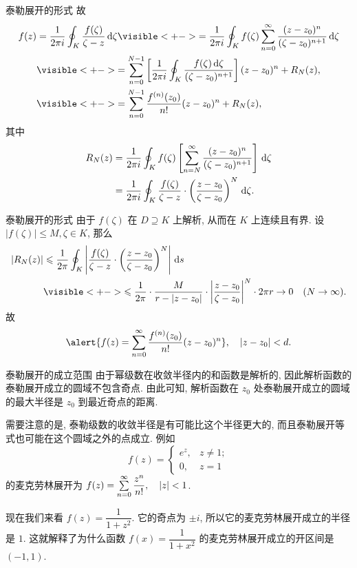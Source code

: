 \begin{frame}{泰勒展开的形式}
	\onslide<+->
	故
	\begin{align*}
		f(z)&=\frac1{2\pi i}\oint_K \frac{f(\zeta)}{\zeta-z}\diff\zeta
		\visible<+->{=\frac1{2\pi i}\oint_K f(\zeta)\sum_{n=0}^\infty\frac{(z-z_0)^n}{(\zeta-z_0)^{n+1}}\diff\zeta}\\
		&\visible<+->{=
		\sum_{n=0}^{N-1}\left[\frac1{2\pi i}\oint_K\frac{f(\zeta)\diff\zeta}{(\zeta-z_0)^{n+1}}\right](z-z_0)^n+R_N(z),}\\
		&\visible<+->{=
		\sum_{n=0}^{N-1}\frac{f^{(n)}(z_0)}{n!}(z-z_0)^n+R_N(z),}
	\end{align*}
	\onslide<+->
	其中
	\begin{align*}
		R_N(z)&=\frac1{2\pi i}\oint_Kf(\zeta)\left[\sum_{n=N}^\infty\frac{(z-z_0)^n}{(\zeta-z_0)^{n+1}}\right]\,\mathrm{d}\zeta\\
		&=\frac1{2\pi i}\oint_K\frac{f(\zeta)}{\zeta-z}\cdot\left(\frac{z-z_0}{\zeta-z_0}\right)^N\,\mathrm{d}\zeta.
	\end{align*}
\end{frame}


\begin{frame}{泰勒展开的形式}
	\onslide<+->
	由于 $f(\zeta)$ 在 $D\supseteq K$ 上解析, 从而在 $K$ 上连续且有界.
	\onslide<+->
	设 $|f(\zeta)|\le M,\zeta\in K$,
	\onslide<+->
	那么
	\begin{align*}
		|R_N(z)|&\le\frac 1{2\pi}\oint_K\abs{\frac{f(\zeta)}{\zeta-z}\cdot\left(\frac{z-z_0}{\zeta-z_0}\right)^N}\diff s\\
		&\visible<+->{\le\frac 1{2\pi}\cdot \frac M{r-|z-z_0|}\cdot\abs{\frac{z-z_0}{\zeta-z_0}}^N\cdot 2\pi r\to 0\quad (N\to\infty).}
	\end{align*}
	\onslide<+->
	故
	\[\alert{f(z)=\sum_{n=0}^\infty\frac{f^{(n)}(z_0)}{n!}(z-z_0)^n},\quad |z-z_0|<d.\]
\end{frame}


\begin{frame}{泰勒展开的成立范围}
	\onslide<+->
	由于幂级数在收敛半径内的和函数是解析的, 因此解析函数的泰勒展开成立的圆域不包含奇点.
	\onslide<+->
	由此可知, 解析函数在 $z_0$ 处\alert{泰勒展开成立的圆域的最大半径是 $z_0$ 到最近奇点的距离}.

	\onslide<+->
	需要注意的是, 泰勒级数的收敛半径是有可能比这个半径更大的,
	\onslide<+->
	而且泰勒展开等式也可能在这个圆域之外的点成立.
	\onslide<+->
	例如 
	\[f(z)=\begin{cases}
	e^z,&z\neq 1;\\ 0,&z=1
	\end{cases}\]
	的麦克劳林展开为 $f(z)=\sum\limits_{n=0}^\infty \dfrac{z^n}{n!},\quad |z|<1$.

	\onslide<+->
	现在我们来看 $f(z)=\dfrac1{1+z^2}$.
	\onslide<+->
	它的奇点为 $\pm i$, 所以它的麦克劳林展开成立的半径是 $1$.
	\onslide<+->
	这就解释了为什么函数 $f(x)=\dfrac1{1+x^2}$ 的麦克劳林展开成立的开区间是 $(-1,1)$.
\end{frame}


